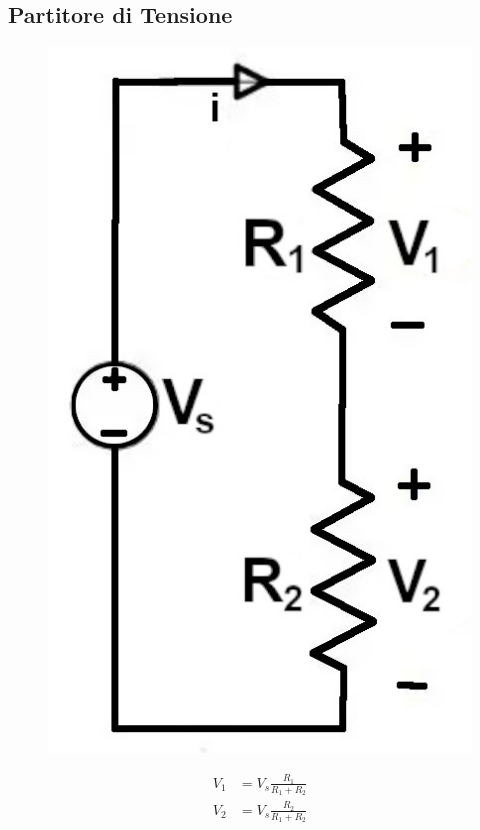 \documentclass[fontsize=8pt]{scrartcl}
\begin{document}
\begin{multicols*}{2}
\subsection*{Partitore di Tensione}

\begin{minipage}[m]{.45\linewidth}
    \begin{figure}[H]
        \centering
        \includegraphics[width=.4\linewidth]{images/partitore_tensione.jpg}
    \end{figure}
\end{minipage}
\begin{minipage}[m]{.45\linewidth}
    \begin{align*}
        V_1 &= V_s\frac{R_1}{R_1+R_2}\\
        V_2 &= V_s\frac{R_2}{R_1+R_2}
    \end{align*}
\end{minipage}

\end{multicols*}
\end{document}
